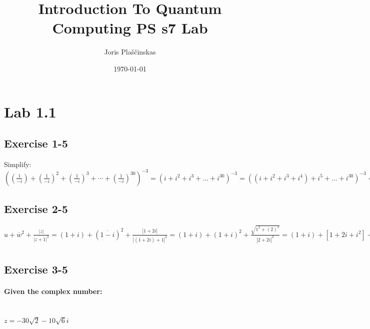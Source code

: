 \documentclass{article}
\title{Introduction To Quantum Computing PS s7 Lab}
\author{Joris Plaščinskas}
\date{\today}
\begin{document}
    \maketitle
    \section*{Lab 1.1}
        \subsection*{Exercise 1-5}
            Simplify: \\
            \begin{math}
                ((\frac{1}{-i}) + (\frac{1}{-i})^2 + (\frac{1}{-i})^3 + \cdots +  (\frac{1}{-i})^{30})^{-3} = (i + i^{2} + i^{3} + ... + i^{30} )^{-3} = ((i + i^{2} + i^{3} + i^{4}) + i^{5} + ... + i^{30} )^{-3} = (i^{29} + i^{30})^{-3} = (i^{1} + i^{2})^{-3} = (i - 1)^{-3} = \frac{1}{(i - 1)^{3}} = \frac{1}{(-1+i)*(-1+i)*(-1+i)} = \frac{1}{-2i * (-1+i)} = \frac{1}{2 + 2i} = \frac{1 - i}{4}
            \end{math}

            
        \subsection*{Exercise 2-5}
            \begin{math}
                u + \overline{w}^2 + \frac{|z|}{|z+1|^2} = (1 + i) + (\overline{1 - i})^2 + \frac{|1 + 2i|}{| (1 + 2i) + 1 |^2} = (1 + i) + (1 + i)^2 + \frac{\sqrt{1^2 + (2)^2}}{|2 + 2i|^2} = (1 + i) + [1 + 2i + i^2] + \frac{\sqrt{5}}{(\sqrt{(2)^2 + (2)^2})^2} = (1 + i) + [1 + 2i - 1] + \frac{\sqrt{5}}{(\sqrt{8})^2} = (1 + i) + [2i] + \frac{\sqrt{5}}{8} = 1 + i + 2i + \frac{\sqrt{5}}{8} = \left(1 + \frac{\sqrt{5}}{8}\right) + 3i
            \end{math}

            
        \subsection*{Exercise 3-5}
            \paragraph{Given the complex number:}\leavevmode\\
            \begin{math}
                z = -30 \sqrt{2} - 10\sqrt{6} i
            \end{math}
\end{document}
